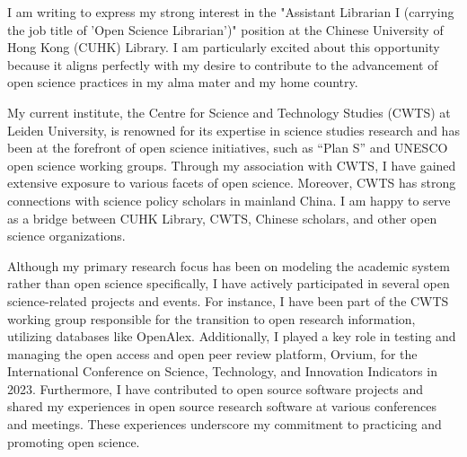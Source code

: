 \documentclass[11pt, a4paper]{awesome-cv}
\begin{document}
\makecvheader[R]

\makecvfooter
  {}%
  {}%
  {}

\makelettertitle

\begin{cvletter}

I am writing to express my strong interest in the "Assistant Librarian I (carrying the job title of 'Open Science Librarian')" position at the Chinese University of Hong Kong (CUHK) Library. I am particularly excited about this opportunity because it aligns perfectly with my desire to contribute to the advancement of open science practices in my alma mater and my home country.

My current institute, the Centre for Science and Technology Studies (CWTS) at Leiden University, is renowned for its expertise in science studies research and has been at the forefront of open science initiatives, such as ``Plan S'' and UNESCO open science working groups. Through my association with CWTS, I have gained extensive exposure to various facets of open science. Moreover, CWTS has strong connections with science policy scholars in mainland China. I am happy to serve as a bridge between CUHK Library, CWTS, Chinese scholars, and other open science organizations.

Although my primary research focus has been on modeling the academic system rather than open science specifically, I have actively participated in several open science-related projects and events. For instance, I have been part of the CWTS working group responsible for the transition to open research information, utilizing databases like OpenAlex. Additionally, I played a key role in testing and managing the open access and open peer review platform, Orvium, for the International Conference on Science, Technology, and Innovation Indicators in 2023. Furthermore, I have contributed to open source software projects and shared my experiences in open source research software at various conferences and meetings. These experiences underscore my commitment to practicing and promoting open science.


\end{cvletter}
\end{document}
